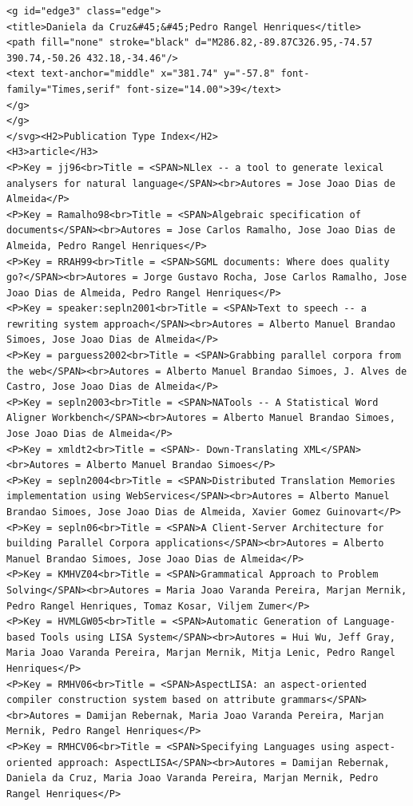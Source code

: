 \documentclass[11pt,a4paper]{report}
\begin{document}
\begin{appendices}
\begin{lstlisting}
<g id="edge3" class="edge">
<title>Daniela da Cruz&#45;&#45;Pedro Rangel Henriques</title>
<path fill="none" stroke="black" d="M286.82,-89.87C326.95,-74.57 390.74,-50.26 432.18,-34.46"/>
<text text-anchor="middle" x="381.74" y="-57.8" font-family="Times,serif" font-size="14.00">39</text>
</g>
</g>
</svg><H2>Publication Type Index</H2>
<H3>article</H3>
<P>Key = jj96<br>Title = <SPAN>NLlex -- a tool to generate lexical analysers for natural language</SPAN><br>Autores = Jose Joao Dias de Almeida</P>
<P>Key = Ramalho98<br>Title = <SPAN>Algebraic specification of documents</SPAN><br>Autores = Jose Carlos Ramalho, Jose Joao Dias de Almeida, Pedro Rangel Henriques</P>
<P>Key = RRAH99<br>Title = <SPAN>SGML documents: Where does quality go?</SPAN><br>Autores = Jorge Gustavo Rocha, Jose Carlos Ramalho, Jose Joao Dias de Almeida, Pedro Rangel Henriques</P>
<P>Key = speaker:sepln2001<br>Title = <SPAN>Text to speech -- a rewriting system approach</SPAN><br>Autores = Alberto Manuel Brandao Simoes, Jose Joao Dias de Almeida</P>
<P>Key = parguess2002<br>Title = <SPAN>Grabbing parallel corpora from the web</SPAN><br>Autores = Alberto Manuel Brandao Simoes, J. Alves de Castro, Jose Joao Dias de Almeida</P>
<P>Key = sepln2003<br>Title = <SPAN>NATools -- A Statistical Word Aligner Workbench</SPAN><br>Autores = Alberto Manuel Brandao Simoes, Jose Joao Dias de Almeida</P>
<P>Key = xmldt2<br>Title = <SPAN>- Down-Translating XML</SPAN><br>Autores = Alberto Manuel Brandao Simoes</P>
<P>Key = sepln2004<br>Title = <SPAN>Distributed Translation Memories implementation using WebServices</SPAN><br>Autores = Alberto Manuel Brandao Simoes, Jose Joao Dias de Almeida, Xavier Gomez Guinovart</P>
<P>Key = sepln06<br>Title = <SPAN>A Client-Server Architecture for building Parallel Corpora applications</SPAN><br>Autores = Alberto Manuel Brandao Simoes, Jose Joao Dias de Almeida</P>
<P>Key = KMHVZ04<br>Title = <SPAN>Grammatical Approach to Problem Solving</SPAN><br>Autores = Maria Joao Varanda Pereira, Marjan Mernik, Pedro Rangel Henriques, Tomaz Kosar, Viljem Zumer</P>
<P>Key = HVMLGW05<br>Title = <SPAN>Automatic Generation of Language-based Tools using LISA System</SPAN><br>Autores = Hui Wu, Jeff Gray, Maria Joao Varanda Pereira, Marjan Mernik, Mitja Lenic, Pedro Rangel Henriques</P>
<P>Key = RMHV06<br>Title = <SPAN>AspectLISA: an aspect-oriented compiler construction system based on attribute grammars</SPAN><br>Autores = Damijan Rebernak, Maria Joao Varanda Pereira, Marjan Mernik, Pedro Rangel Henriques</P>
<P>Key = RMHCV06<br>Title = <SPAN>Specifying Languages using aspect-oriented approach: AspectLISA</SPAN><br>Autores = Damijan Rebernak, Daniela da Cruz, Maria Joao Varanda Pereira, Marjan Mernik, Pedro Rangel Henriques</P>

\end{lstlisting}
\end{appendices}
\end{document}
